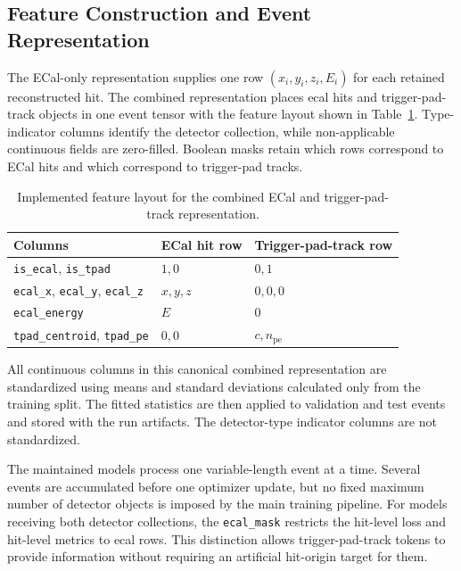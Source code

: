 \subsection{Feature Construction and Event Representation}
\label{sec:method_features}

The ECal-only representation supplies one row
\((x_i,y_i,z_i,E_i)\) for each retained reconstructed hit. The combined
representation places \gls{ecal} hits and trigger-pad-track objects in one
event tensor with the feature layout shown in
Table~\ref{tab:combined_features}. Type-indicator columns identify the
detector collection, while non-applicable continuous fields are zero-filled.
Boolean masks retain which rows correspond to ECal hits and which correspond
to trigger-pad tracks.

\begin{table}[H]
    \centering
    \caption{Implemented feature layout for the combined ECal and
    trigger-pad-track representation.}
    \label{tab:combined_features}
    \begin{tabular}{lll}
        \hline
        Columns & ECal hit row & Trigger-pad-track row \\
        \hline
        \texttt{is\_ecal}, \texttt{is\_tpad} & \(1,0\) & \(0,1\) \\
        \texttt{ecal\_x}, \texttt{ecal\_y}, \texttt{ecal\_z} &
            \(x,y,z\) & \(0,0,0\) \\
        \texttt{ecal\_energy} & \(E\) & \(0\) \\
        \texttt{tpad\_centroid}, \texttt{tpad\_pe} &
            \(0,0\) & \(c,n_{\mathrm{pe}}\) \\
        \hline
    \end{tabular}
\end{table}

All continuous columns in this canonical combined representation are
standardized using means and standard deviations calculated only from the
training split. The fitted statistics are then applied to validation and test
events and stored with the run artifacts. The detector-type indicator columns
are not standardized.

The maintained models process one variable-length event at a time. Several
events are accumulated before one optimizer update, but no fixed maximum
number of detector objects is imposed by the main training pipeline. For
models receiving both detector collections, the \texttt{ecal\_mask} restricts
the hit-level loss and hit-level metrics to \gls{ecal} rows. This distinction
allows trigger-pad-track tokens to provide information without requiring an
artificial hit-origin target for them.

